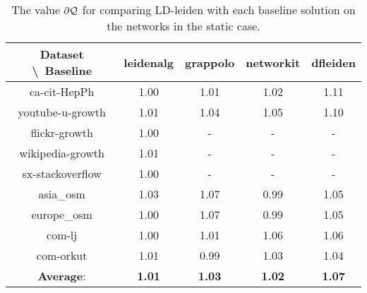 \begin{table}[H]
	\centering
	\begin{tabular}{|c|c|c|c|c|}
		\hline
		Dataset \textbackslash\ Baseline & leidenalg & grappolo & networkit & dfleiden \\
		\hline
		ca-cit-HepPh & 1.00 & 1.01 & 1.02 & 1.11 \\
		\hline
		youtube-u-growth & 1.01 & 1.04 & 1.05 & 1.10 \\
		\hline
		flickr-growth & 1.00 & - & - & - \\
		\hline
		wikipedia-growth & 1.01 & - & - & - \\
		\hline
		sx-stackoverflow & 1.00 & - & - & - \\
		\hline
		asia\_osm & 1.03 & 1.07 & 0.99 & 1.05 \\
		\hline
		europe\_osm & 1.00 & 1.07 & 0.99 & 1.05 \\
		\hline
		com-lj & 1.00 & 1.01 & 1.06 & 1.06 \\
		\hline
		com-orkut & 1.01 & 0.99 & 1.03 & 1.04 \\
		\hline
		\textbf{Average}: & \textbf{1.01} & \textbf{1.03} & \textbf{1.02} & \textbf{1.07} \\
		\hline
	\end{tabular}
\caption{The value $\partial\mathcal{Q}$ for comparing LD-leiden with each baseline solution on the networks in the static case.}
\label{T:lastM:1 batches}
\end{table}